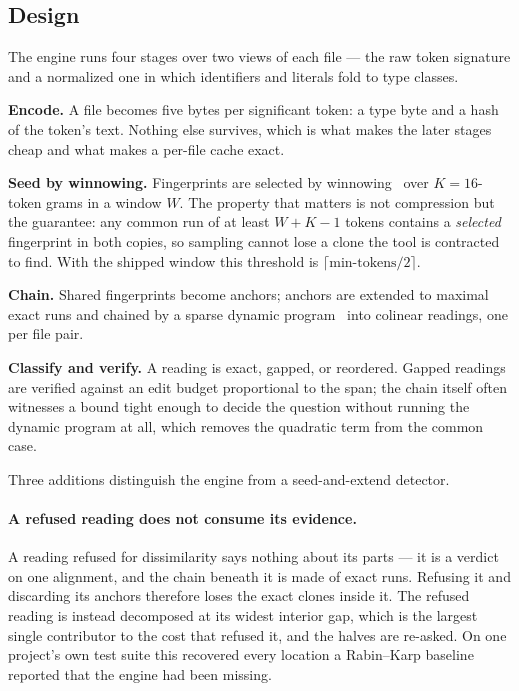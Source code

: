 \documentclass[10pt,a4paper]{article}
\newcounter{prop}[section]
\begin{document}
\subsection{Design}
The engine runs four stages over two views of each file --- the raw token signature and a
normalized one in which identifiers and literals fold to type classes.

\textbf{Encode.} A file becomes five bytes per significant token: a type byte and a hash of the
token's text. Nothing else survives, which is what makes the later stages cheap and what makes a
per-file cache exact.

\textbf{Seed by winnowing.} Fingerprints are selected by winnowing~\cite{winnowing} over
$K = 16$-token grams in a window $W$. The property that matters is not compression but the
guarantee: any common run of at least $W + K - 1$ tokens contains a \emph{selected} fingerprint
in both copies, so sampling cannot lose a clone the tool is contracted to find. With the shipped
window this threshold is $\lceil \text{min-tokens}/2 \rceil$.

\textbf{Chain.} Shared fingerprints become anchors; anchors are extended to maximal exact runs and
chained by a sparse dynamic program~\cite{sparse} into colinear readings, one per file pair.

\textbf{Classify and verify.} A reading is exact, gapped, or reordered. Gapped readings are
verified against an edit budget proportional to the span; the chain itself often witnesses a
bound tight enough to decide the question without running the dynamic program at all, which
removes the quadratic term from the common case.

Three additions distinguish the engine from a seed-and-extend detector.

\paragraph{A refused reading does not consume its evidence.} A reading refused for dissimilarity
says nothing about its parts --- it is a verdict on one alignment, and the chain beneath it is
made of exact runs. Refusing it and discarding its anchors therefore loses the exact clones inside
it. The refused reading is instead decomposed at its widest interior gap, which is the largest
single contributor to the cost that refused it, and the halves are re-asked. On one project's own
test suite this recovered every location a Rabin--Karp baseline reported that the engine had been
missing.
\end{document}
